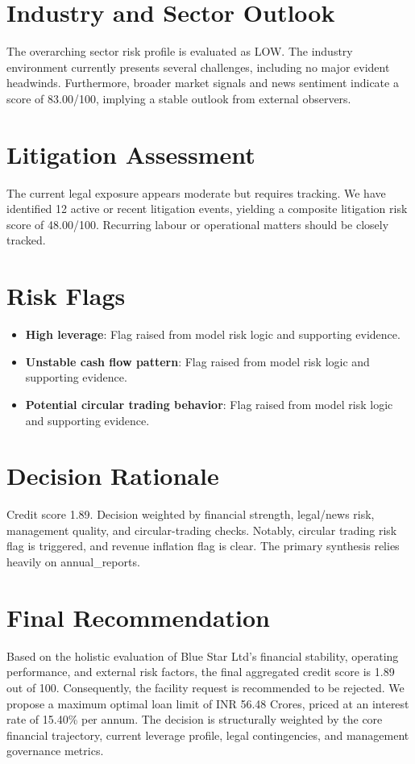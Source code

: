\documentclass[11pt,a4paper]{article}
\begin{document}
\section*{Industry and Sector Outlook}
The overarching sector risk profile is evaluated as LOW. The industry environment currently presents several challenges, including no major evident headwinds. Furthermore, broader market signals and news sentiment indicate a score of 83.00/100, implying a stable outlook from external observers.

\section*{Litigation Assessment}
The current legal exposure appears moderate but requires tracking. We have identified 12 active or recent litigation events, yielding a composite litigation risk score of 48.00/100. Recurring labour or operational matters should be closely tracked.

\section*{Risk Flags}
\begin{itemize}
\item \textbf{High leverage}: Flag raised from model risk logic and supporting evidence.
\item \textbf{Unstable cash flow pattern}: Flag raised from model risk logic and supporting evidence.
\item \textbf{Potential circular trading behavior}: Flag raised from model risk logic and supporting evidence.
\end{itemize}

\section*{Decision Rationale}
Credit score 1.89. Decision weighted by financial strength, legal/news risk, management quality, and circular-trading checks. Notably, circular trading risk flag is triggered, and revenue inflation flag is clear. The primary synthesis relies heavily on annual\_reports.

\section*{Final Recommendation}
Based on the holistic evaluation of Blue Star Ltd's financial stability, operating performance, and external risk factors, the final aggregated credit score is 1.89 out of 100. Consequently, the facility request is recommended to be rejected. We propose a maximum optimal loan limit of INR 56.48 Crores, priced at an interest rate of 15.40\% per annum. The decision is structurally weighted by the core financial trajectory, current leverage profile, legal contingencies, and management governance metrics.
\end{document}
